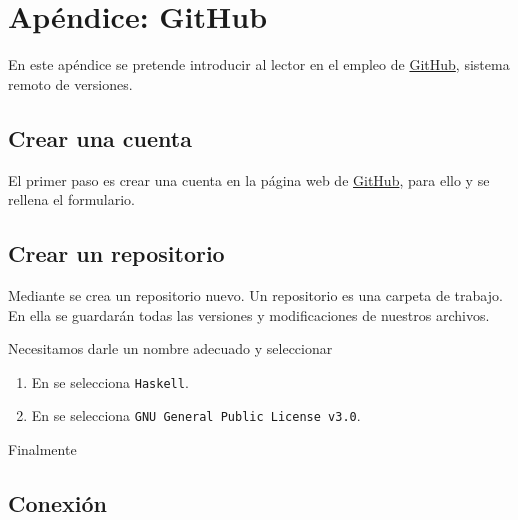 \chapter{Apéndice: GitHub}

En este apéndice se pretende introducir al lector en el empleo de
\href{https://github.com/}{GitHub}, sistema remoto de versiones.

\section{Crear una cuenta}

El primer paso es crear una cuenta en la página web de
\href{https://github.com/}{GitHub}, para ello  y se
rellena el formulario.

\section{Crear un repositorio}

Mediante  se crea un repositorio nuevo.  Un
repositorio es una carpeta de trabajo. En ella se guardarán todas las versiones
y modificaciones de nuestros archivos.

Necesitamos darle un nombre adecuado y seleccionar
\begin{enumerate}
\item En  se selecciona \texttt{Haskell}.
\item En  se selecciona \texttt{GNU General Public License v3.0}.
\end{enumerate}

Finalmente 

\section{Conexión}

